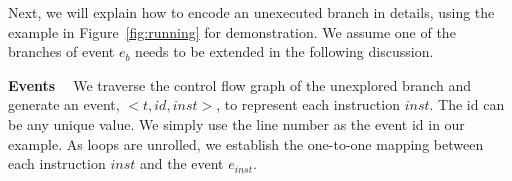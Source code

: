 Next, we will explain how to encode an unexecuted branch in details, 
using the example in Figure~\ref{fig:running} for demonstration.
We assume one of the branches of event $e_b$ needs to be extended in
the following discussion.

{\bf Events \ } We traverse the control flow graph of the unexplored branch 
and generate an event,  $<t, id, inst>$, to represent 
each instruction $inst$. The id can be any unique value.
We simply use the line number as the event id in our example. As loops are
unrolled,
we establish the one-to-one mapping between each instruction $inst$ and 
the event $e_{inst}$.


